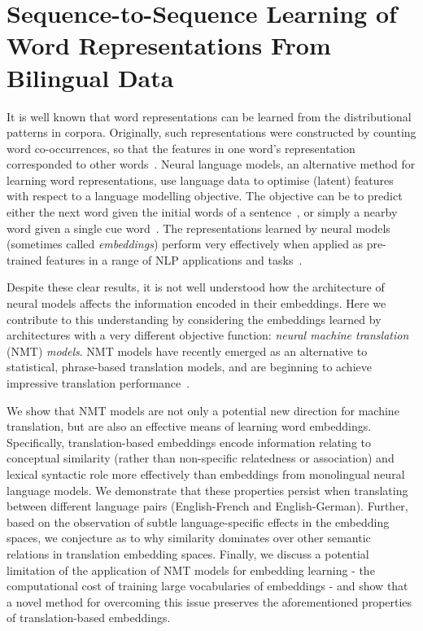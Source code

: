 

\section{Sequence-to-Sequence Learning of Word Representations From Bilingual Data}


It is well known that word representations can be learned from the distributional patterns in corpora. Originally, such representations were constructed by counting word co-occurrences, so that the features in one word's representation corresponded to other words~\cite{landauer1997solution,turney2010frequency}. Neural language models, an alternative method for learning word representations, use language data to optimise (latent) features with respect to a language modelling objective. The objective can be to predict either the next word given the initial words of a sentence~\cite{Bengio2003lm,mnih2009scalable,collobert2008unified}, or simply a nearby word given a single cue word~\cite{mikolov2013distributed,Pennington2014}. The representations learned by neural models (sometimes called \emph{embeddings}) perform very effectively when applied as pre-trained features in a range of NLP applications and tasks~\cite{baroni2014don}. 

Despite these clear results, it is not well understood how the architecture of neural models affects the information encoded in their embeddings. Here we contribute to this understanding by considering the embeddings learned by architectures with a very different objective function: \emph{neural machine translation} (NMT) \emph{models}. NMT models have recently emerged as an alternative to statistical, phrase-based translation models, and are beginning to achieve impressive translation performance~\cite{kalchbrenner13emnlp,devlin2014fast,Sutskever2014sequence}.

We show that NMT models are not only a potential new direction for machine translation, but are also an effective means of learning word embeddings. Specifically, translation-based embeddings encode information relating to conceptual similarity (rather than non-specific relatedness or association) and lexical syntactic role more effectively than embeddings from monolingual neural language models. We demonstrate that these properties persist when translating between different language pairs (English-French and English-German). Further, based on the observation of subtle language-specific effects in the embedding spaces, we conjecture as to why similarity dominates over other semantic relations in translation embedding spaces. Finally, we discuss a potential limitation of the application of NMT models for embedding learning - the computational cost of training large vocabularies of embeddings - and show that a novel method for overcoming this issue preserves the aforementioned properties of translation-based embeddings. 

